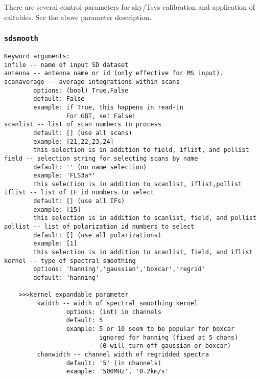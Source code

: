 There are several control parameters for sky/Tsys calibration and 
application of caltables. See the above parameter description.


\subsubsection{{\tt sdsmooth}}
\label{section:sd.sdtasks.tasks.sdsmooth}

\begin{verbatim}
Keyword arguments:
infile -- name of input SD dataset
antenna -- antenna name or id (only effective for MS input). 
scanaverage -- average integrations within scans
        options: (bool) True,False
        default: False
        example: if True, this happens in read-in
                 For GBT, set False!
scanlist -- list of scan numbers to process
        default: [] (use all scans)
        example: [21,22,23,24]
        this selection is in addition to field, iflist, and pollist
field -- selection string for selecting scans by name
        default: '' (no name selection)
        example: 'FLS3a*'
        this selection is in addition to scanlist, iflist,pollist
iflist -- list of IF id numbers to select
        default: [] (use all IFs)
        example: [15]
        this selection is in addition to scanlist, field, and pollist
pollist -- list of polarization id numbers to select
        default: [] (use all polarizations)
        example: [1]
        this selection is in addition to scanlist, field, and iflist
kernel -- type of spectral smoothing
        options: 'hanning','gaussian','boxcar','regrid'
        default: 'hanning'

    >>>kernel expandable parameter
         kwidth -- width of spectral smoothing kernel
                 options: (int) in channels 
                 default: 5
                 example: 5 or 10 seem to be popular for boxcar
                          ignored for hanning (fixed at 5 chans)
                          (0 will turn off gaussian or boxcar)
         chanwidth -- channel width of regridded spectra
                 default: '5' (in channels)
                 example: '500MHz', '0.2km/s'


\end{verbatim}
